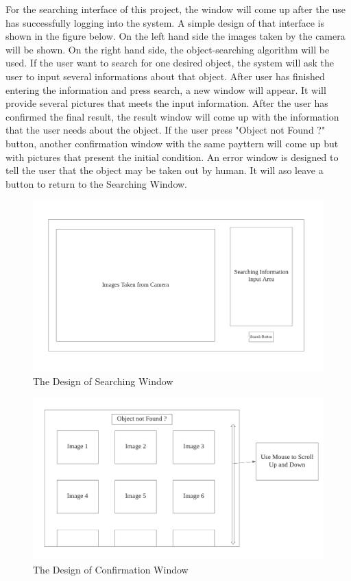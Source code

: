 \documentclass[12pt, titlepage]{article}
\begin{document}
For the searching interface of this project, the window will come up after the use has successfully logging into the system. A simple design of that interface is shown in the figure below. On the left hand side the images taken by the camera will be shown. On the right hand side, the object-searching algorithm will be used. If the user want to search for one desired object, the system will ask the user to input several informations about that object. After user has finished entering the information and press search, a new window will appear. It will provide several pictures that meets the input information. After the user has confirmed the final result, the result window will come up with the information that the user needs about the object.
If the user press "Object not Found ?" button, another confirmation window with the same payttern will come up but with pictures that present the initial condition. An error window is designed to tell the user that the object may be taken out by human. It will aso leave a button to return to the Searching Window. 

\begin{figure}[H]
    \centering
    \includegraphics[scale=0.6]{Search.png}
    \caption{The Design of Searching Window}
\end{figure}

\begin{figure}[H]
    \centering
    \includegraphics[scale=0.6]{Confirmation.png}
    \caption{The Design of Confirmation Window}
\end{figure}
\end{document}
